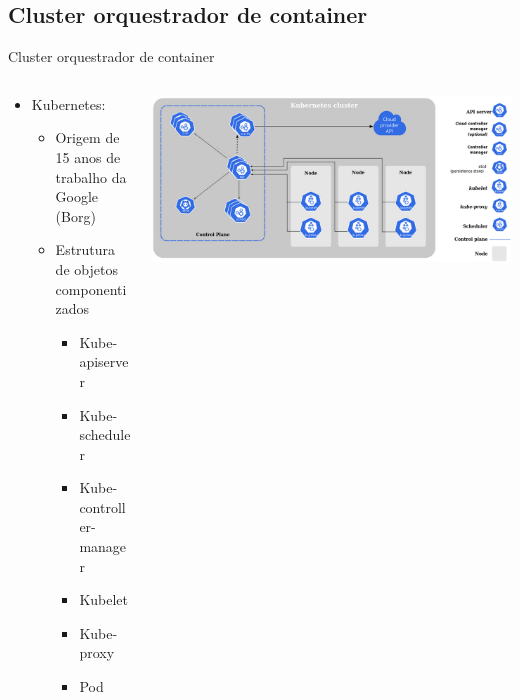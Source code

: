 \documentclass[10pt,brazil]{beamer}
\theoremstyle{definition}
\begin{document}
\subsection{Cluster orquestrador de container}

\begin{frame}{Cluster orquestrador de container}
  \begin{columns}
    \begin{column}{0.5\textwidth}
      \begin{itemize}
        \item Kubernetes\textregistered:
              \begin{itemize}
                \item Origem de 15 anos de trabalho da Google (Borg) %
                \item Estrutura de objetos componentizados %
                      \begin{itemize}
                        \item Kube-apiserver
                        \item Kube-scheduler
                        \item Kube-controller-manager
                        \item Kubelet
                        \item Kube-proxy
                        \item Pod
                      \end{itemize}
              \end{itemize}
      \end{itemize}
    \end{column}
    \begin{column}{0.5\textwidth}  %
      \begin{center}
        \includegraphics[width=1\textwidth]{kubeadm-node.png}
      \end{center}
    \end{column}
  \end{columns}
\end{frame}
\end{document}
